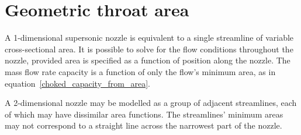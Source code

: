 \documentclass[a4paper, 11pt, twoside]{report}
\begin{document}



\chapter{Geometric throat area}
\label{chapter_geometric_throat_area}





A 1-dimensional supersonic nozzle is equivalent to a single streamline of variable cross-sectional area. It is possible to solve for the flow conditions throughout the nozzle, provided area is specified as a function of position along the nozzle. The mass flow rate capacity is a function of only the flow's minimum area, as in equation~\ref{choked_capacity_from_area}.

A 2-dimensional nozzle may be modelled as a group of adjacent streamlines, each of which may have dissimilar area functions. The streamlines' minimum areas may not correspond to a straight line across the narrowest part of the nozzle. 
\end{document}
